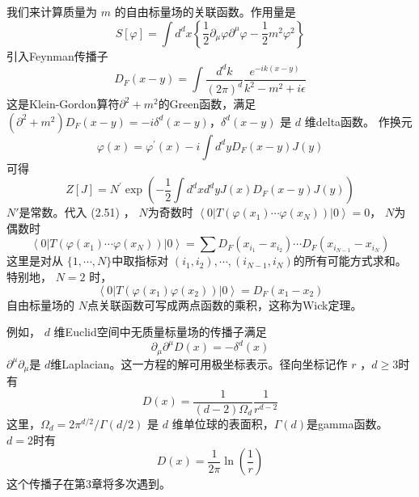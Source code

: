 我们来计算质量为 $m$ 的自由标量场的关联函数。作用量是
\begin{equation}
		S[\varphi]=\int d^{d} x\left\{\frac{1}{2} \partial_{\mu} \varphi \partial^{\mu} \varphi-\frac{1}{2} m^{2} \varphi^{2}\right\}
\end{equation}
引入Feynman传播子
\begin{equation}
		D_{F}(x-y)=\int \frac{d^{d} k}{(2 \pi)^{d}} \frac{e^{-i k(x-y)}}{k^{2}-m^{2}+i \epsilon}
\end{equation}
这是Klein-Gordon算符$ \partial^2+m^2 $的Green函数，满足 $\left(\partial^{2}+m^{2}\right) D_{F}(x-y)=-i \delta^{d}(x-y) $，$ \delta^{d}(x-y)$ 是 $d$ 维delta函数。
作换元
\begin{equation}
	\varphi(x)=\varphi^{\prime}(x)-i \int d^{d} y D_{F}(x-y) J(y)
\end{equation}
可得
\begin{equation}
	Z[J]=N^{\prime} \exp \left(-\frac{1}{2} \int d^{d} x d^{d} y J(x) D_{F}(x-y) J(y)\right)
\end{equation}
$N' $是常数。代入 (2.51) ， $N $为奇数时 $\left\langle 0\left|T\left(\varphi\left(x_{1}\right) \cdots \varphi\left(x_{N}\right)\right)\right| 0\right\rangle=0 $， $N $为偶数时
\begin{equation}
		\left\langle 0\left|T\left(\varphi\left(x_{1}\right) \cdots \varphi\left(x_{N}\right)\right)\right| 0\right\rangle=\sum D_{F}\left(x_{i_{1}}-x_{i_{2}}\right) \cdots D_{F}\left(x_{i_{N-1}}-x_{i_{N}}\right)
\end{equation}
这里是对从 $\{1,\cdots,N\} $中取指标对 $\left(i_{1}, i_{2}\right), \cdots,\left(i_{N-1}, i_{N}\right) $的所有可能方式求和。特别地， $N=2$ 时，
\begin{equation}
		\left\langle 0\left|T\left(\varphi\left(x_{1}\right) \varphi\left(x_{2}\right)\right)\right| 0\right\rangle=D_{F}\left(x_{1}-x_{2}\right)
\end{equation}
自由标量场的 $N $点关联函数可写成两点函数的乘积，这称为Wick定理。

例如， $d$ 维Euclid空间中无质量标量场的传播子满足
\begin{equation}
		\partial_{\mu} \partial^{\mu} D(x)=-\delta^{d}(x)
\end{equation}
$\partial^\mu \partial_\mu $是 $d $维Laplacian。这一方程的解可用极坐标表示。径向坐标记作 $r$ ，$ d\geq 3 $时有
\begin{equation}
		D(x)=\frac{1}{(d-2) \Omega_{d}} \frac{1}{r^{d-2}}
\end{equation}
这里，$ \Omega_{d}=2 \pi^{d / 2} / \Gamma(d / 2)$ 是 $d$ 维单位球的表面积，$ \Gamma(d) $是gamma函数。 $d=2 $时有
\begin{equation}
	D(x)=\frac{1}{2 \pi} \ln \left(\frac{1}{r}\right)
\end{equation}
这个传播子在第3章将多次遇到。

